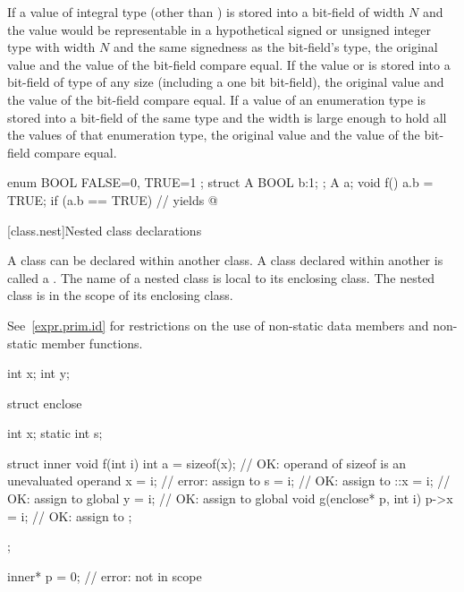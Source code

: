 \pnum
If a value of integral type (other than ) is stored
into a bit-field of width $N$ and the value would be representable
in a hypothetical signed or unsigned integer type
with width $N$ and the same signedness as the bit-field's type,
the original value and the value of the bit-field compare equal.
If the value  or  is stored into a bit-field of
type  of any size (including a one bit bit-field), the
original  value and the value of the bit-field compare
equal. If a value of an enumeration type is stored into a bit-field of the
same type and the width is large
enough to hold all the values of that enumeration type,
the original value and the value of the bit-field compare equal.
\begin{example}
\begin{codeblock}
enum BOOL { FALSE=0, TRUE=1 };
struct A {
  BOOL b:1;
};
A a;
void f() {
  a.b = TRUE;
  if (a.b == TRUE)              // yields 
    { @\commentellip@ }
}
\end{codeblock}
\end{example}

[class.nest]{Nested class declarations}%
%

\pnum
A class can be declared within another class. A class declared within
another is called a . The name of a nested class
is local to its enclosing class.
%
The nested class is in the scope of its enclosing class.
\begin{note}
See~\ref{expr.prim.id} for restrictions on the use of non-static data
members and non-static member functions.
\end{note}

\begin{example}
\begin{codeblock}
int x;
int y;

struct enclose {
  int x;
  static int s;

  struct inner {
    void f(int i) {
      int a = sizeof(x);        // OK: operand of sizeof is an unevaluated operand
      x = i;                    // error: assign to 
      s = i;                    // OK: assign to 
      ::x = i;                  // OK: assign to global 
      y = i;                    // OK: assign to global 
    }
    void g(enclose* p, int i) {
      p->x = i;                 // OK: assign to 
    }
  };
};

inner* p = 0;                   // error:  not in scope
\end{codeblock}
\end{example}


